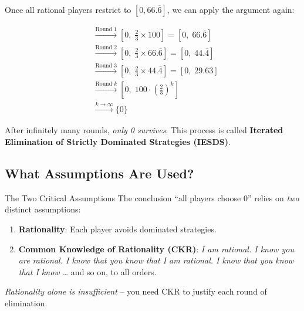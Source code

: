 \documentclass[12pt, a4paper]{article}
\begin{document}
Once all rational players restrict to $[0, 66.\overline{6}]$, we can apply the argument again:

\begin{align*}
  [0, 100] &\xrightarrow{\text{Round 1}} \left[0,\; \tfrac{2}{3} \times 100\right] = [0,\; 66.\overline{6}] \\
           &\xrightarrow{\text{Round 2}} \left[0,\; \tfrac{2}{3} \times 66.\overline{6}\right] = [0,\; 44.\overline{4}] \\
           &\xrightarrow{\text{Round 3}} \left[0,\; \tfrac{2}{3} \times 44.\overline{4}\right] = [0,\; 29.63] \\
           &\xrightarrow{\text{Round } k} \left[0,\; 100 \cdot \left(\tfrac{2}{3}\right)^k\right] \\
           &\xrightarrow{k \to \infty} \{0\}
\end{align*}

After infinitely many rounds, \emph{only 0 survives}. This process is called \textbf{Iterated Elimination of Strictly Dominated Strategies (IESDS)}.

\begin{center}
\end{center}

\subsection{What Assumptions Are Used?}

\begin{warnbox}{The Two Critical Assumptions}
  The conclusion ``all players choose 0'' relies on \emph{two} distinct assumptions:
  \begin{enumerate}[label=\textbf{A\arabic*.}, leftmargin=*]
    \item \textbf{Rationality}: Each player avoids dominated strategies.
    \item \textbf{Common Knowledge of Rationality (CKR)}: \emph{I am rational. I know you are rational. I know that you know that I am rational. I know that you know that I know \ldots} and so on, to all orders.
  \end{enumerate}
  \emph{Rationality alone is insufficient} -- you need CKR to justify each round of elimination.
\end{warnbox}
\end{document}

